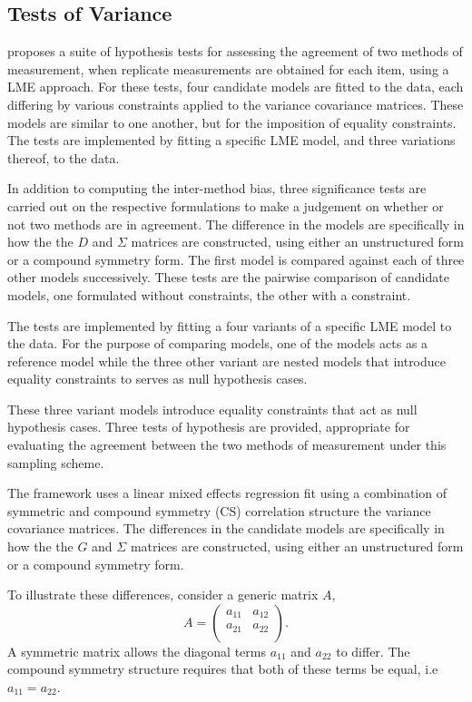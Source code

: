 \documentclass[12pt, a4paper]{report}
\theoremstyle{plain}
\theoremstyle{definition}
\theoremstyle{remark}
\begin{document}
\subsection*{Tests of Variance}	
\citet{ARoy2009} proposes a suite of hypothesis tests for assessing the agreement of two methods of measurement, when replicate measurements are obtained for each item, using a LME approach. For these tests, four candidate models are fitted to the data, each differing by various constraints applied to the variance covariance matrices. These models are similar to one another, but for the imposition of equality constraints. The tests are implemented by fitting a specific LME model, and three variations thereof, to the data. 

In addition to computing the inter-method bias, three significance tests are carried out on the respective formulations to make a judgement on whether or not two methods are in agreement. The difference in the models are specifically in how the the $D$ and $\Sigma$ matrices are constructed, using either an unstructured form or a compound symmetry form. The first model is compared against each of three other models successively. These tests are the pairwise comparison of candidate models, one formulated without constraints, the other with a constraint.


The tests are implemented by fitting a four variants of a specific LME model to the data. For the purpose of comparing models, one of the models acts as a reference model while the three other variant are nested models that introduce equality constraints to serves as null hypothesis cases. 

These three variant models introduce equality constraints that act as null hypothesis cases. Three tests of hypothesis are provided, appropriate for evaluating the agreement between the two methods of measurement under this sampling scheme. 
		
The framework uses a linear mixed effects regression fit using a combination of symmetric and compound symmetry (CS) correlation structure the variance covariance matrices.	
The differences in the candidate models are specifically in how the the $G$ and $\Sigma$ matrices are constructed, using either an unstructured form or a compound symmetry form. 

To illustrate these differences, consider a generic matrix $A$,
\[{A} = \left( \begin{array}{cc}
a_{11} & a_{12}  \\
a_{21} & a_{22}  \\
\end{array}\right).	\]
A symmetric matrix allows the diagonal terms $a_{11}$ and $a_{22}$ to differ. The compound symmetry structure requires that both of these terms be equal, i.e $a_{11} = a_{22}$.
\end{document}
